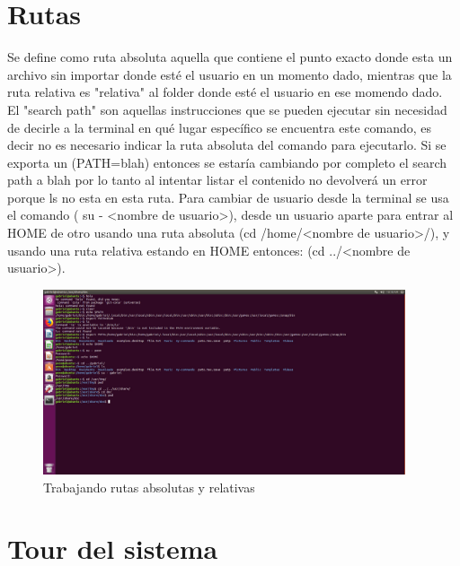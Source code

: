 \documentclass[
  letterpaper, 
  maincolor=black,
  sectioncolor=black!90,
  subsectioncolor=black!70,
  itemtextcolor=black!40,
]{fortysecondscv}
\begin{document}
\section{Rutas}
    Se define como ruta absoluta aquella que contiene el punto exacto donde esta un archivo sin importar donde esté el usuario en un momento dado, mientras que la ruta relativa es "relativa" al folder donde esté el usuario en ese momendo dado. \\
    El "search path" son aquellas instrucciones que se pueden ejecutar sin necesidad de decirle a la terminal en qué lugar específico se encuentra este comando, es decir no es necesario indicar la ruta absoluta del comando para ejecutarlo.
    Si se exporta un (PATH=blah) entonces se estaría cambiando por completo el search path a blah por lo tanto al intentar listar el contenido no devolverá un error porque ls no esta en esta ruta.
    Para cambiar de usuario desde la terminal se usa el comando ( su - <nombre de usuario>), desde un usuario aparte para entrar al HOME de otro usando una ruta absoluta (cd /home/<nombre de usuario>/), y usando una ruta relativa estando en HOME entonces: (cd ../<nombre de usuario>).
    \begin{figure}[H]
        \centering
        \includegraphics[trim= 0 240 650 0,clip,width=0.95\textwidth]{img/rutas.jpg}
        \caption{Trabajando rutas absolutas y relativas}
        \label{fig:my_label}
    \end{figure}
\section{Tour del sistema}
\end{document}

